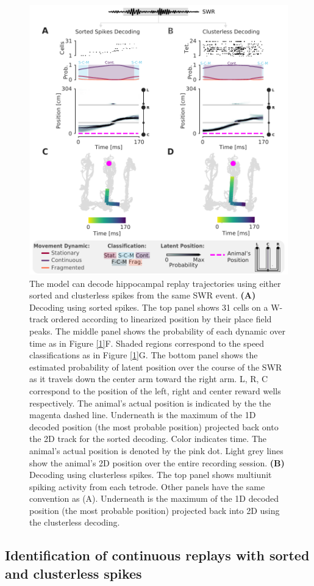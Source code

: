 \documentclass[times, twoside]{zHenriquesLab-StyleBioRxiv}
\begin{document}
\begin{figure}%
\centering
\includegraphics[width=0.80\linewidth]{figures/Figure2/Figure2_v5}
\caption{The model can decode hippocampal replay trajectories using either sorted and clusterless spikes from the same SWR event. \textbf{(A)} Decoding using sorted spikes. The top panel shows 31 cells on a W-track ordered according to linearized position by their place field peaks. The middle panel shows the probability of each dynamic over time as in Figure \ref{1}F. Shaded regions correspond to the speed classifications as in Figure \ref{1}G. The bottom panel shows the estimated probability of latent position over the course of the SWR as it travels down the center arm toward the right arm. L, R, C correspond to the position of the left, right and center reward wells respectively. The animal's actual position is indicated by the the magenta dashed line. Underneath is the maximum of the 1D decoded position (the most probable position) projected back onto the 2D track for the sorted decoding. Color indicates time. The animal's actual position is denoted by the pink dot. Light grey lines show the animal's 2D position over the entire recording session. \textbf{(B)} Decoding using clusterless spikes. The top panel shows multiunit spiking activity from each tetrode. Other panels have the same convention as (A). Underneath is the maximum of the 1D decoded position (the most probable position) projected back into 2D using the clusterless decoding.
}
\label{2}
\end{figure}
\subsection*{Identification of continuous replays with sorted and clusterless spikes}
\end{document}
